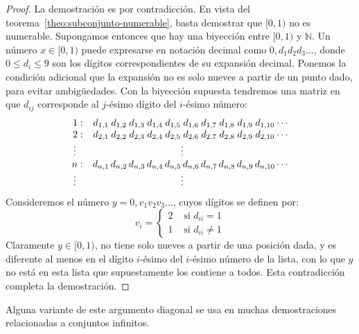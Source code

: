   \begin{proof}
    La demostración es por contradicción.
    En vista del teorema~\ref{theo:subconjunto-numerable},
    basta demostrar que \([0, 1)\) no es numerable.
    Supongamos entonces
    que hay una biyección entre \([0, 1)\) y \(\mathbb{N}\).
    Un número \(x \in [0, 1)\)
    puede expresarse en notación decimal como
    \(0,d_1 d_2 d_3 \dotso\),
    donde \(0 \le d_i \le 9\) son los dígitos correspondientes
    de su expansión decimal.
    Ponemos la condición adicional
    que la expansión no es solo nueves
    a partir de un punto dado,
    para evitar ambigüedades.
    Con la biyección supuesta tendremos una matriz
    en que \(d_{i j}\) corresponde al \(j\)\nobreakdash-ésimo dígito
    del \(i\)\nobreakdash-ésimo número:
    \begin{equation*}
      \begin{array}{r*{10}{c@{\,}}l}
	1: & d_{1, 1} & d_{1, 2} & d_{1, 3} & d_{1, 4} & d_{1, 5} & d_{1, 6} &
	     d_{1, 7} & d_{1, 8} & d_{1, 9} & d_{1, 10} & \cdots \\
	2: & d_{2, 1} & d_{2, 2} & d_{2, 3} & d_{2, 4} & d_{2, 5} & d_{2, 6} &
	     d_{2, 7} & d_{2, 8} & d_{2, 9} & d_{2, 10} & \cdots \\
	\vdots\;\;\,
	   & \multicolumn{10}{c}{\vdots} \\
	n: & d_{n, 1} & d_{n, 2} & d_{n, 3} & d_{n, 4} & d_{n, 5} & d_{n, 6} &
	     d_{n, 7} & d_{n, 8} & d_{n, 9} & d_{n, 10} & \cdots \\
	\vdots\;\;\,
	   & \multicolumn{10}{c}{\vdots}
      \end{array}
    \end{equation*}
    Consideremos el número \(y = 0,v_1 v_2 v_3 \dotso\),
    cuyos dígitos se definen por:
    \begin{equation*}
      v_i
	=
	\begin{cases}
	  2 & \text{\ si \(d_{i i} = 1\)} \\
	  1 & \text{\ si \(d_{i i} \ne 1\)}
	\end{cases}
    \end{equation*}
    Claramente \(y \in [0, 1)\),
    no tiene solo nueves a partir de una posición dada,
    y es diferente
    al menos en el dígito \(i\)\nobreakdash-ésimo
    del \(i\)\nobreakdash-ésimo número de la lista,
    con lo que \(y\) no está en esta lista
    que supuestamente los contiene a todos.
    Esta contradicción completa la demostración.
  \end{proof}
  Alguna variante de este argumento diagonal
  se usa en muchas demostraciones
  relacionadas a conjuntos infinitos.

